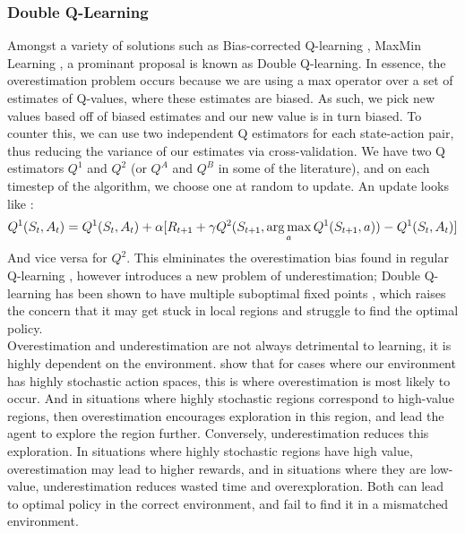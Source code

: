 \documentclass[12pt]{article}
\DeclareMathOperator*{\argmax}{arg\,max}
\begin{document}
\subsubsection{Double Q-Learning}
Amongst a variety of solutions such as Bias-corrected Q-learning \autocite{lee2013bias}, MaxMin Learning \autocite{DBLP:journals/corr/abs-2002-06487}, a prominant proposal is known as Double Q-learning. In essence, the overestimation problem occurs because we are using a max operator over a set of estimates of Q-values, where these estimates are biased. As such, we pick new values based off of biased estimates and our new value is in turn biased. To counter this, we can use two independent Q estimators for each state-action pair, thus reducing the variance of our estimates via cross-validation. We have two Q estimators $Q^1$ and $Q^2$ (or $Q^A$ and $Q^B$ in some of the literature), and on each timestep of the algorithm, we choose one at random to update. An update looks like \autocite{NIPS2010_091d584f,rlintrochap6}:
\begin{equation}
    \mathlarger{
        Q^1(S_t,A_t) = Q^1(S_t,A_t) + \alpha[R_{t+1} + \gamma Q^2(S_{t+1},\argmax_{a} Q^1(S_{t+1},a)) - Q^1(S_t,A_t)]
    }
\end{equation}
And vice versa for $Q^2$. This elmininates the overestimation bias found in regular Q-learning \autocite{NIPS2010_091d584f,rlintrochap6}, however introduces a new problem of underestimation; Double Q-learning has been shown to have multiple suboptimal fixed points \autocite{DBLP:journals/corr/abs-2109-14419}, which raises the concern that it may get stuck in local regions and struggle to find the optimal policy. \\\newline
Overestimation and underestimation are not always detrimental to learning, it is highly dependent on the environment. \textcite{DBLP:journals/corr/abs-2002-06487} show that for cases where our environment has highly stochastic action spaces, this is where overestimation is most likely to occur. And in situations where highly stochastic regions correspond to high-value regions, then overestimation encourages exploration in this region, and lead the agent to explore the region further. Conversely, underestimation reduces this exploration. In situations where highly stochastic regions have high value, overestimation may lead to higher rewards, and in situations where they are low-value, underestimation reduces wasted time and overexploration. Both can lead to optimal policy in the correct environment, and fail to find it in a mismatched environment.
\end{document}
